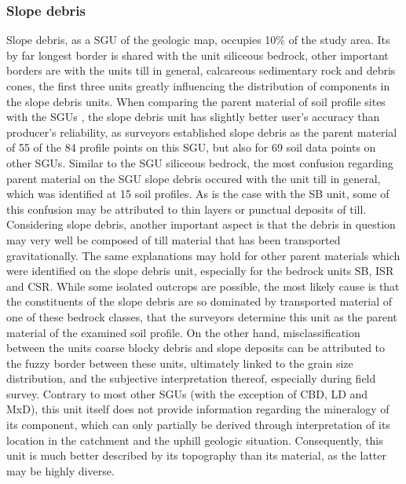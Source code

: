 \documentclass[preprint,12pt,authoryear]{elsarticle}
\begin{document}
\subsubsection{Slope debris}
Slope debris, as a SGU of the geologic map, occupies 10\% of the study area. Its by far longest border is shared with the unit siliceous bedrock, other important borders are with the units till in general, calcareous sedimentary rock and debris cones, the first three units greatly influencing the distribution of components in the slope debris units. When comparing the parent material of soil profile sites with the SGUs , the slope debris unit has slightly better user's accuracy than producer's reliability, as surveyors established slope debris as the parent material of 55 of the 84 profile points on this SGU, but also for 69 soil data points on other SGUs. Similar to the SGU siliceous bedrock, the most confusion regarding parent material on the SGU slope debris occured with the unit till in general, which was identified at 15 soil profiles. As is the case with the SB unit, some of this confusion may be attributed to thin layers or punctual deposits of till. Considering slope debris, another important aspect is that the debris in question may very well be composed of till material that has been transported gravitationally. The same explanations may hold for other parent materials which were identified on the slope debris unit, especially for the bedrock units SB, ISR and  CSR. While some isolated outcrops are possible, the most likely cause is that the constituents of the slope debris are so dominated by transported material of one of these bedrock classes, that the surveyors determine this unit as the parent material of the examined soil profile. On the other hand, misclassification between the units coarse blocky debris and slope deposits can be attributed to the fuzzy border between these units, ultimately linked to the grain size distribution, and the subjective interpretation thereof, especially during field survey. 
Contrary to most other SGUs (with the exception of CBD, LD and MxD), this unit itself does not provide information regarding the mineralogy of its component, which can only partially be derived through  interpretation  of its location in the catchment and the uphill geologic situation. Consequently, this unit  is much better described by its topography than its material, as the latter may be highly diverse. 
\end{document}
